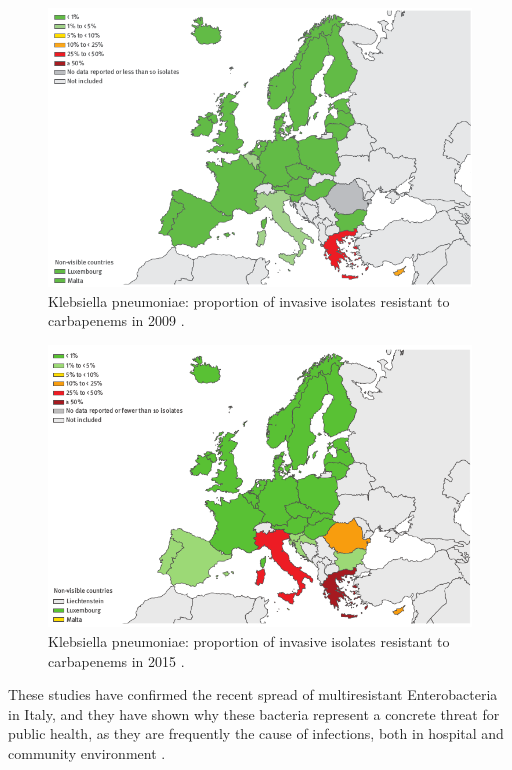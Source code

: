 \documentclass[11pt]{report}
\begin{document}
\begin{figure}[htp]
\centering
\includegraphics[scale=0.60]{img/K.pneu_2009.png}
\caption{Klebsiella pneumoniae: proportion of invasive isolates resistant to carbapenems in 2009 \cite{ECDC_Surveillance}.}
\label{}
\end{figure}

\clearpage
\begin{figure}[htp]
\centering
\includegraphics[scale=0.60]{img/K.pneu_2015.png}
\caption{Klebsiella pneumoniae: proportion of invasive isolates resistant to carbapenems in 2015 \cite{ECDC_Surveillance}.}
\label{}
\end{figure}

These studies have confirmed the recent spread of multiresistant Enterobacteria in Italy, and they have shown why these bacteria represent a concrete threat for public health, as they are frequently the cause of infections, both in hospital and community environment \cite{circolare2013}.
\end{document}
